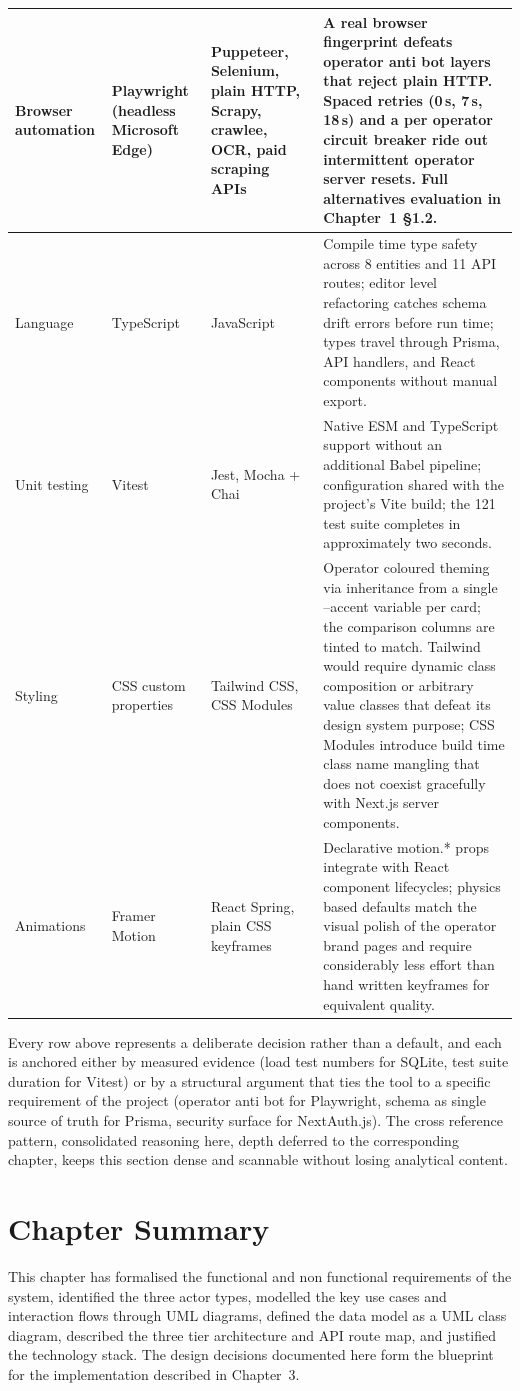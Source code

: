 {\begin{longtable}{|p{2.3cm}|p{2.0cm}|p{2.6cm}|p{7.2cm}|}
    \hline
    Browser automation & Playwright (headless Microsoft Edge) & Puppeteer, Selenium, plain HTTP, Scrapy, crawlee, OCR, paid scraping APIs &
    A real browser fingerprint defeats operator anti bot layers that reject plain HTTP. Spaced retries (0\,s, 7\,s, 18\,s) and a per operator circuit breaker ride out intermittent operator server resets. Full alternatives evaluation in Chapter~1 §1.2. \\
    \hline
    Language & TypeScript & JavaScript &
    Compile time type safety across 8 entities and 11 API routes; editor level refactoring catches schema drift errors before run time; types travel through Prisma, API handlers, and React components without manual export. \\
    \hline
    Unit testing & Vitest & Jest, Mocha + Chai &
    Native ESM and TypeScript support without an additional Babel pipeline; configuration shared with the project's Vite build; the 121 test suite completes in approximately two seconds. \\
    \hline
    Styling & CSS custom properties & Tailwind CSS, CSS Modules &
    Operator coloured theming via inheritance from a single --accent variable per card; the comparison columns are tinted to match. Tailwind would require dynamic class composition or arbitrary value classes that defeat its design system purpose; CSS Modules introduce build time class name mangling that does not coexist gracefully with Next.js server components. \\
    \hline
    Animations & Framer Motion & React Spring, plain CSS keyframes &
    Declarative motion.* props integrate with React component lifecycles; physics based defaults match the visual polish of the operator brand pages and require considerably less effort than hand written keyframes for equivalent quality. \\
    \hline
\end{longtable}
}

Every row above represents a deliberate decision rather than a default, and each is anchored either by measured evidence (load test numbers for SQLite, test suite duration for Vitest) or by a structural argument that ties the tool to a specific requirement of the project (operator anti bot for Playwright, schema as single source of truth for Prisma, security surface for NextAuth.js). The cross reference pattern, consolidated reasoning here, depth deferred to the corresponding chapter, keeps this section dense and scannable without losing analytical content.

\section{Chapter Summary}

This chapter has formalised the functional and non functional requirements of the system, identified the three actor types, modelled the key use cases and interaction flows through UML diagrams, defined the data model as a UML class diagram, described the three tier architecture and API route map, and justified the technology stack. The design decisions documented here form the blueprint for the implementation described in Chapter~3.
